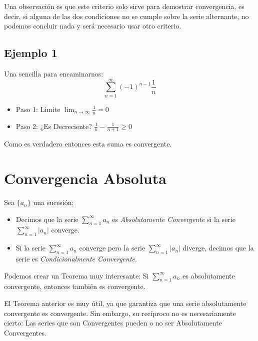 \documentclass[12pt]{article}							    %
\begin{document}
Una observación es que este criterio solo sirve para demostrar convergencia, es decir, si alguna de las dos condiciones no se cumple sobre la serie alternante, no podemos concluir nada y será necesario usar otro criterio.

\subsection{Ejemplo 1}
Una sencilla para encaminarnos:
\begin{equation*}
    \sum_{n=1}^{\infty} (-1)^{n-1} \frac{1}{n}
\end{equation*}


 \begin{itemize}
    \item Paso 1: Limite $\lim_{n \to \infty} \frac{1}{n}=0$
    \item Paso 2: ¿Es Decreciente? $\frac{1}{n}-\frac{1}{n+1} \geq 0 $
 \end{itemize}

Como es verdadero entonces esta suma es convergente.





\clearpage
\section{Convergencia Absoluta}

Sea $\{a_n\}$ una sucesión:

\begin{itemize}
    \item Decimos que la serie $\sum_{n=1}^{\infty} a_n$ es \emph{Absolutamente Convergente} si la serie $\sum_{n=1}^{\infty} |a_n|$ converge.

    \item Si la serie $\sum_{n=1}^{\infty} a_n$ converge pero la serie $\sum_{n=1}^{\infty} |a_n|$ diverge, decimos que la serie es \emph{Condicionalmente Convergente}.
\end{itemize}

Podemos crear un Teorema muy interesante:
Si $\sum_{n=1}^{\infty} a_n$ es absolutamente convergente, entonces también es convergente.

El Teorema anterior es muy útil, ya que garantiza que una serie absolutamente convergente es convergente.
Sin embargo, su recíproco no es necesariamente cierto: Las series que son Convergentes pueden o no ser Absolutamente Convergentes. 
\end{document}
